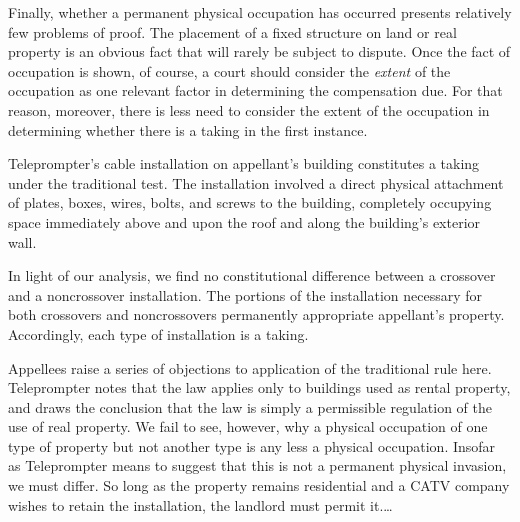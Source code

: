 Finally, whether a permanent physical occupation has occurred presents
relatively few problems of proof. The placement of a fixed structure on land or
real property is an obvious fact that will rarely be subject to dispute. Once
the fact of occupation is shown, of course, a court should consider the
\textit{extent} of the occupation as one relevant factor in determining the
compensation due. For that reason, moreover, there is less need to consider the
extent of the occupation in determining whether there is a taking in the first
instance.



Teleprompter's cable installation on appellant's building constitutes a taking
under the traditional test. The installation involved a direct physical
attachment of plates, boxes, wires, bolts, and screws to the building,
completely occupying space immediately above and upon the roof and along the
building's exterior wall.

In light of our analysis, we find no constitutional difference between a
crossover and a noncrossover installation. The portions of the installation
necessary for both crossovers and noncrossovers permanently appropriate
appellant's property. Accordingly, each type of installation is a taking.

Appellees raise a series of objections to application of the traditional rule
here. Teleprompter notes that the law applies only to buildings used as rental
property, and draws the conclusion that the law is simply a permissible
regulation of the use of real property. We fail to see, however, why a physical
occupation of one type of property but not another type is any less a physical
occupation. Insofar as Teleprompter means to suggest that this is not a
permanent physical invasion, we must differ. So long as the property remains
residential and a CATV company wishes to retain the installation, the landlord
must permit it.\ldots

